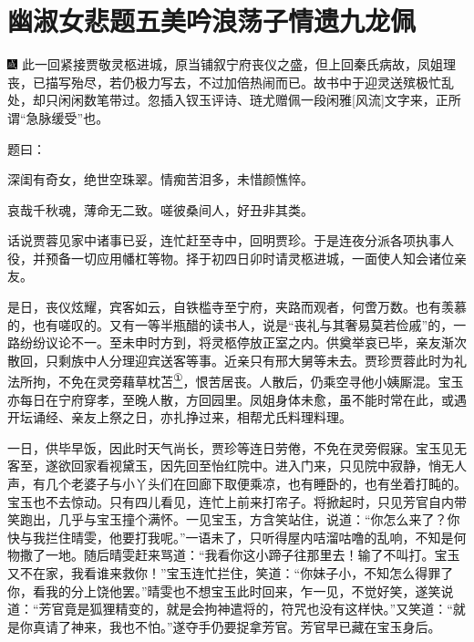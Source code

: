 

\chapter{幽淑女悲题五美吟\hspace{.5em}浪荡子情遗九龙佩}

{\includegraphics[width=3mm]{../Images/00005} \kaishu 此一回紧接贾敬灵柩进城，原当铺叙宁府丧仪之盛，但上回秦氏病故，凤姐理丧，已描写殆尽，若仍极力写去，不过加倍热闹而已。故书中于迎灵送殡极忙乱处，却只闲闲数笔带过。忽插入钗玉评诗、琏尤赠佩一段闲雅{[}风流{]}文字来，正所谓``急脉缓受''也。}

题曰：

深闺有奇女，绝世空珠翠。情痴苦泪多，未惜颜憔悴。

哀哉千秋魂，薄命无二致。嗟彼桑间人，好丑非其类。

话说贾蓉见家中诸事已妥，连忙赶至寺中，回明贾珍。于是连夜分派各项执事人役，并预备一切应用幡杠等物。择于初四日卯时请灵柩进城，一面使人知会诸位亲友。

是日，丧仪炫耀，宾客如云，自铁槛寺至宁府，夹路而观者，何啻万数。也有羡慕的，也有嗟叹的。又有一等半瓶醋的读书人，说是``丧礼与其奢易莫若俭戚''的，一路纷纷议论不一。至未申时方到，将灵柩停放正室之内。供奠举哀已毕，亲友渐次散回，只剩族中人分理迎宾送客等事。近亲只有邢大舅等未去。贾珍贾蓉此时为礼法所拘，不免在灵旁藉草枕苫\href{../Text/part0068_split_000.html\#lnkback_1_a}{\textsuperscript{①}}，恨苦居丧。人散后，仍乘空寻他小姨厮混。宝玉亦每日在宁府穿孝，至晚人散，方回园里。凤姐身体未愈，虽不能时常在此，或遇开坛诵经、亲友上祭之日，亦扎挣过来，相帮尤氏料理料理。

一日，供毕早饭，因此时天气尚长，贾珍等连日劳倦，不免在灵旁假寐。宝玉见无客至，遂欲回家看视黛玉，因先回至怡红院中。进入门来，只见院中寂静，悄无人声，有几个老婆子与小丫头们在回廊下取便乘凉，也有睡卧的，也有坐着打盹的。宝玉也不去惊动。只有四儿看见，连忙上前来打帘子。将掀起时，只见芳官自内带笑跑出，几乎与宝玉撞个满怀。一见宝玉，方含笑站住，说道：``你怎么来了？你快与我拦住晴雯，他要打我呢。''一语未了，只听得屋内咭溜咕噜的乱响，不知是何物撒了一地。随后晴雯赶来骂道：``我看你这小蹄子往那里去！输了不叫打。宝玉又不在家，我看谁来救你！''宝玉连忙拦住，笑道：``你妹子小，不知怎么得罪了你，看我的分上饶他罢。''晴雯也不想宝玉此时回来，乍一见，不觉好笑，遂笑说道：``芳官竟是狐狸精变的，就是会拘神遣将的，符咒也没有这样快。''又笑道：``就是你真请了神来，我也不怕。''遂夺手仍要捉拿芳官。芳官早已藏在宝玉身后。

